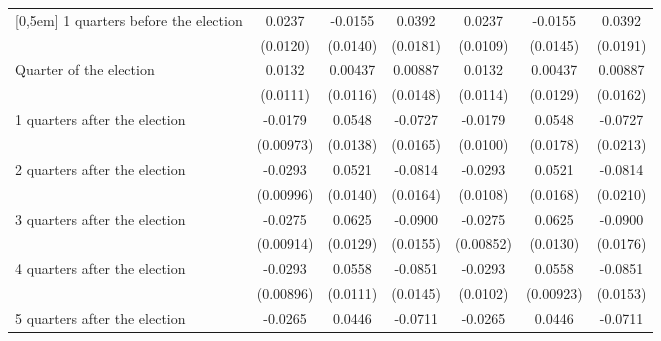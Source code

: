 \begin{table}[!ht]
\begin{tabular}{l*{6}{c}}
[0,5em]
 1 quarters before the election&      0.0237\sym{*}  &     -0.0155         &      0.0392\sym{*}  &      0.0237\sym{*}  &     -0.0155         &      0.0392\sym{*}  \\
                    &    (0.0120)         &    (0.0140)         &    (0.0181)         &    (0.0109)         &    (0.0145)         &    (0.0191)         \\
[0,5em]
Quarter of the election&      0.0132         &     0.00437         &     0.00887         &      0.0132         &     0.00437         &     0.00887         \\
                    &    (0.0111)         &    (0.0116)         &    (0.0148)         &    (0.0114)         &    (0.0129)         &    (0.0162)         \\
[0,5em]
 1 quarters after the election&     -0.0179         &      0.0548\sym{***}&     -0.0727\sym{***}&     -0.0179         &      0.0548\sym{**} &     -0.0727\sym{***}\\
                    &   (0.00973)         &    (0.0138)         &    (0.0165)         &    (0.0100)         &    (0.0178)         &    (0.0213)         \\
[0,5em]
 2 quarters after the election&     -0.0293\sym{**} &      0.0521\sym{***}&     -0.0814\sym{***}&     -0.0293\sym{**} &      0.0521\sym{**} &     -0.0814\sym{***}\\
                    &   (0.00996)         &    (0.0140)         &    (0.0164)         &    (0.0108)         &    (0.0168)         &    (0.0210)         \\
[0,5em]
 3 quarters after the election&     -0.0275\sym{**} &      0.0625\sym{***}&     -0.0900\sym{***}&     -0.0275\sym{**} &      0.0625\sym{***}&     -0.0900\sym{***}\\
                    &   (0.00914)         &    (0.0129)         &    (0.0155)         &   (0.00852)         &    (0.0130)         &    (0.0176)         \\
[0,5em]
 4 quarters after the election&     -0.0293\sym{**} &      0.0558\sym{***}&     -0.0851\sym{***}&     -0.0293\sym{**} &      0.0558\sym{***}&     -0.0851\sym{***}\\
                    &   (0.00896)         &    (0.0111)         &    (0.0145)         &    (0.0102)         &   (0.00923)         &    (0.0153)         \\
[0,5em]
 5 quarters after the election&     -0.0265\sym{**} &      0.0446\sym{***}&     -0.0711\sym{***}&     -0.0265\sym{*}  &      0.0446\sym{**} &     -0.0711\sym{***}\\

\end{tabular}
\end{table}
